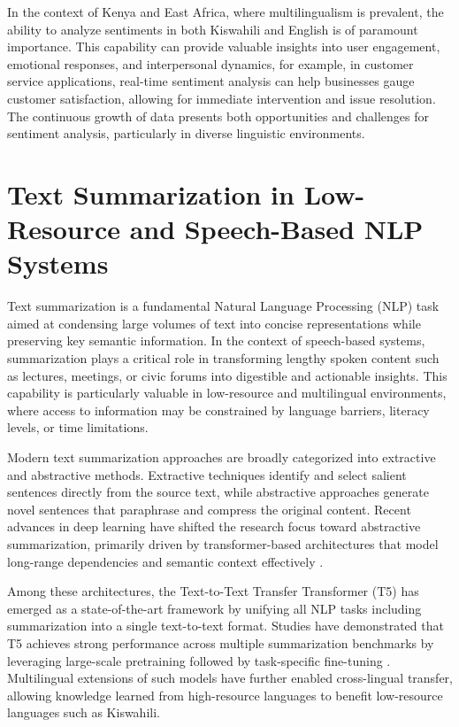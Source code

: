 \noindent In the context of Kenya and East Africa, where multilingualism is prevalent, the ability to analyze sentiments in both Kiswahili and English is of paramount importance. This capability can provide valuable insights into user engagement, emotional responses, and interpersonal dynamics, for example, in customer service applications, real-time sentiment analysis can help businesses gauge customer satisfaction, allowing for immediate intervention and issue resolution. The continuous growth of data presents both opportunities and challenges for sentiment analysis, particularly in diverse linguistic environments.

\section{Text Summarization in Low-Resource and Speech-Based NLP Systems}

Text summarization is a fundamental Natural Language Processing (NLP) task aimed at condensing large volumes of text into concise representations while preserving key semantic information. In the context of speech-based systems, summarization plays a critical role in transforming lengthy spoken content such as lectures, meetings, or civic forums into digestible and actionable insights. This capability is particularly valuable in low-resource and multilingual environments, where access to information may be constrained by language barriers, literacy levels, or time limitations.

Modern text summarization approaches are broadly categorized into extractive and abstractive methods. Extractive techniques identify and select salient sentences directly from the source text, while abstractive approaches generate novel sentences that paraphrase and compress the original content. Recent advances in deep learning have shifted the research focus toward abstractive summarization, primarily driven by transformer-based architectures that model long-range dependencies and semantic context effectively \cite{raffel2020exploring}.

Among these architectures, the Text-to-Text Transfer Transformer (T5) has emerged as a state-of-the-art framework by unifying all NLP tasks including summarization into a single text-to-text format. Studies have demonstrated that T5 achieves strong performance across multiple summarization benchmarks by leveraging large-scale pretraining followed by task-specific fine-tuning \cite{raffel2020exploring}. Multilingual extensions of such models have further enabled cross-lingual transfer, allowing knowledge learned from high-resource languages to benefit low-resource languages such as Kiswahili.

